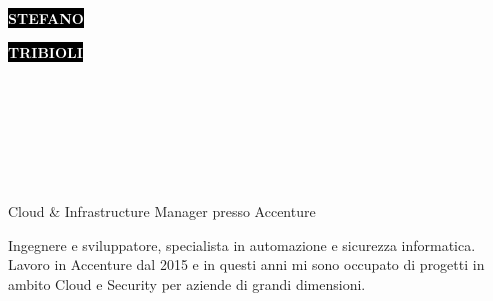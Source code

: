 \documentclass[9pt]{developercv}
\begin{document}
\begin{minipage}[t]{0.42\textwidth}
	\vspace{-\baselineskip}
	
	\colorbox{black}{{\HUGE\textcolor{white}{\textbf{\MakeUppercase{Stefano}}}}}
	
	\colorbox{black}{{\HUGE\textcolor{white}{\textbf{\MakeUppercase{Tribioli}}}}}
\end{minipage}
\begin{minipage}[t]{0.29\textwidth}
	\vspace{-\baselineskip}
	
	\\
	\\	
\end{minipage}
\begin{minipage}[t]{0.29\textwidth}
	\vspace{-\baselineskip}
	
	\\
	\\
	\\
\end{minipage}

\begin{minipage}[t]{1\textwidth}
\vspace{6pt}
\LARGE Cloud \& Infrastructure Manager presso Accenture
\end{minipage}


\begin{minipage}[t]{1\textwidth}
	\vspace{-\baselineskip}
	Ingegnere e sviluppatore, specialista in automazione e sicurezza informatica.
	\\
	Lavoro in Accenture dal 2015 e in questi anni mi sono occupato di progetti in ambito Cloud e Security per aziende di grandi dimensioni.
\end{minipage}

\end{document}
